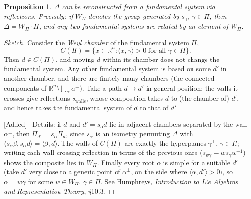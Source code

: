 \documentclass[11pt,openany]{book}
\theoremstyle{plain}
\newtheorem{proposition}[theorem]{Proposition}
\theoremstyle{definition}
\theoremstyle{remark}
\newcommand{\added}[1]{{\color{addcol}#1}}
\newcommand{\orig}[1]{\marginpar{\raggedright\scriptsize\color{gray}#1}}
\newenvironment{addedblock}{\par\color{addcol}\noindent\textsf{\small[Added]}\ }{\par}
\newcommand{\R}{\mathbb{R}}
\newcommand{\ip}[2]{\langle #1, #2\rangle}
\begin{document}
\begin{proposition}\label{L04a:prop:reconstruct}
$\Delta$ can be reconstructed from a fundamental system via reflections.
\added{Precisely: if $W_\Pi$ denotes the group generated by $s_\gamma$, $\gamma\in\Pi$, then
$\Delta = W_\Pi\cdot\Pi$, and any two fundamental systems are related by an element of $W_\Pi$.}
\end{proposition}

\begin{proof}[Sketch]
Consider the \emph{Weyl chamber} of the fundamental system $\Pi$,
\[
  C(\Pi)=\{x\in\R^n : \ip{x}{\gamma}>0 \text{ for all }\gamma\in\Pi\}.
\]
\orig{crossed out: ``orbit $d$ to each\dots''}
Then $d\in C(\Pi)$, and moving $d$ within its chamber does not change the fundamental system.
Any other fundamental system is based on some $d'$ in another chamber, and there are finitely many
chambers \added{(the connected components of $\R^n\setminus\bigcup_{\alpha}\alpha^\perp$)}. Take a path
$d\to d'$ \added{in general position}; the walls it crosses give reflections $s_{\text{walls}}$, whose
composition takes $d$ to (the chamber of) $d'$, and hence takes the fundamental system of $d$ to that
of $d'$.
\begin{addedblock}
Details: if $d$ and $d'=s_\alpha d$ lie in adjacent chambers separated by the wall $\alpha^\perp$,
then $\Pi_{d'}=s_\alpha\Pi_d$, since $s_\alpha$ is an isometry permuting $\Delta$ with
$\ip{s_\alpha\beta}{s_\alpha d}=\ip{\beta}{d}$. The walls of $C(\Pi)$ are exactly the hyperplanes
$\gamma^\perp$, $\gamma\in\Pi$; writing each wall-crossing reflection in terms of the previous ones
($s_{w\gamma}=ws_\gamma w^{-1}$) shows the composite lies in $W_\Pi$. Finally every root $\alpha$ is
simple for a suitable $d'$ (take $d'$ very close to a generic point of $\alpha^\perp$, on the side where
$\ip{\alpha}{d'}>0$), so $\alpha=w\gamma$ for some $w\in W_\Pi$, $\gamma\in\Pi$. See Humphreys,
\emph{Introduction to Lie Algebras and Representation Theory}, \S10.3.
\end{addedblock}
\end{proof}
\end{document}
